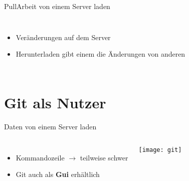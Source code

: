 \documentclass{beamer}
\begin{document}
      \begin{frame}{Pull}{Arbeit von einem Server laden}
        \begin{columns}
          \begin{itemize}[<+->]
            \item Veränderungen auf dem Server
            \item Herunterladen gibt einem die Änderungen von anderen
          \end{itemize}
        \end{columns}
      \end{frame}

    \section{Git als Nutzer}

      \begin{frame}{Daten von einem Server laden}
        \begin{columns}
            \begin{itemize}[<+->]
              \item Kommandozeile $\rightarrow$ teilweise schwer
              \item Git auch als \textbf{Gui} erhältlich
            \end{itemize}

            \texttt{[image: git]}
        \end{columns}
      \end{frame}
\end{document}
